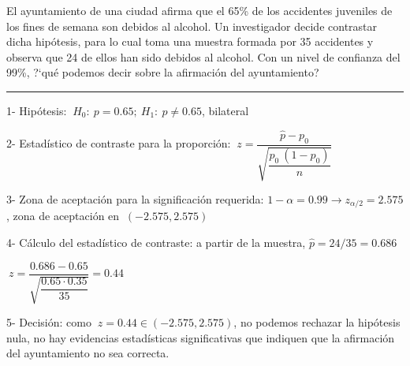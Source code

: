 \vspace{4mm}
\begin{example}


El ayuntamiento de una ciudad afirma que el 65\% de los accidentes juveniles de los fines de semana son debidos al alcohol. Un investigador decide contrastar dicha hipótesis, para lo cual toma una muestra formada por 35 accidentes y observa que 24 de ellos han sido debidos al alcohol. Con un nivel de confianza del 99\%, ?`qué podemos decir sobre la afirmación del ayuntamiento?	

\rule{150pt}{0.1pt}

\vspace{2mm} 1- Hipótesis: $\ H_0:\ p=0.65;\ H_1:\ p\neq 0.65$, bilateral

\vspace{2mm} 2- Estadístico de contraste para la proporción: $\ z = \dfrac{\widehat p - p_0}{\sqrt{ \dfrac{p_0\ (1-p_0)}{n} }}$

\vspace{2mm} 3- Zona de aceptación para la significación requerida: $1-\alpha=0.99 \to z_{\alpha/2}=2.575$, zona de aceptación en $\ (-2.575,2.575)$

\vspace{2mm} 4- Cálculo del estadístico de contraste: a partir de la muestra, $\widehat p=24/35=0.686$

\vspace{2mm} $\ z=\dfrac{0.686-0.65}{\sqrt{\dfrac{0.65\cdot 0.35}{35}}}=0.44$

\vspace{2mm} 5- Decisión: como $ \ z=0.44 \in (-2.575,2.575)$, no podemos rechazar la hipótesis nula, no hay evidencias estadísticas significativas que indiquen que la afirmación del ayuntamiento no sea correcta.
\end{example}

